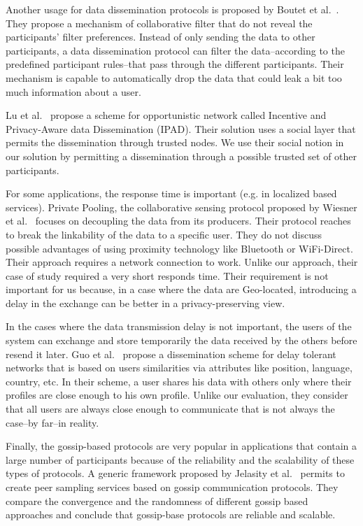 
Another usage for data dissemination protocols is proposed by Boutet et al.~\cite{DBLP:journals/computing/BoutetFGJK16}.
They propose a mechanism of collaborative filter that do not reveal the participants' filter preferences.
Instead of only sending the data to other participants, a data dissemination protocol can filter the data--according to the predefined participant rules--that pass through the different participants.
Their mechanism is capable to automatically drop the data that could leak a bit too much information about a user.

Lu et al.~\cite{DBLP:conf/infocom/LuLSCS13} propose a scheme for opportunistic network called Incentive and Privacy-Aware data Dissemination (IPAD).
Their solution uses a social layer that permits the dissemination through trusted nodes.
We use their social notion in our solution by permitting a dissemination through a possible trusted set of other participants.

For some applications, the response time is important (e.g. in localized based services).
Private Pooling, the collaborative sensing protocol proposed by Wiesner et al.~\cite{DBLP:conf/mobisec/WiesnerDD11} focuses on decoupling the data from its producers.
Their protocol reaches to break the linkability of the data to a specific user.
They do not discuss possible advantages of using proximity technology like Bluetooth or WiFi-Direct.
Their approach requires a network connection to work.
Unlike our approach, their case of study required a very short responds time.
Their requirement is not important for us because, in a case where the data are Geo-located, introducing a delay in the exchange can be better in a privacy-preserving view.

In the cases where the data transmission delay is not important, the users of the system can exchange and store temporarily the data received by the others before resend it later.
Guo et al.~\cite{DBLP:conf/infocom/GuoZYF13} propose a dissemination scheme for delay tolerant networks that is based on users similarities via attributes like position, language, country, etc.
In their scheme, a user shares his data with others only where their profiles are close enough to his own profile.
Unlike our evaluation, they consider that all users are always close enough to communicate that is not always the case--by far--in reality.

Finally, the gossip-based protocols are very popular in applications that contain a large number of participants because of the reliability and the scalability of these types of protocols.
A generic framework proposed by Jelasity et al.~\cite{DBLP:conf/middleware/JelasityGKS04} permits to create peer sampling services based on gossip communication protocols.
They compare the convergence and the randomness of different gossip based approaches and conclude that gossip-base protocols are reliable and scalable.


